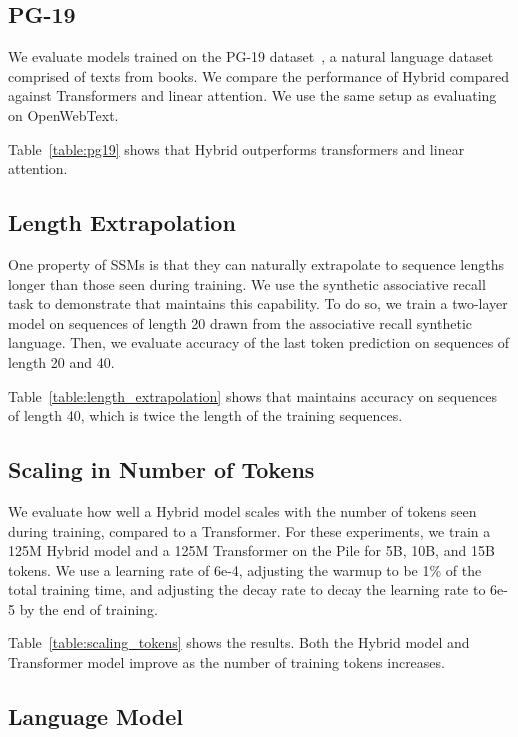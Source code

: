 \subsection{PG-19}
We evaluate models trained on the PG-19 dataset~\citep{rae2019compressive}, a natural language dataset comprised of texts from books.
We compare the performance of Hybrid \hthree compared against Transformers and linear attention.
We use the same setup as evaluating on OpenWebText.



Table~\ref{table:pg19} shows that Hybrid \hthree outperforms transformers and linear attention.

\subsection{Length Extrapolation}
One property of SSMs is that they can naturally extrapolate to sequence lengths longer than those seen during training.
We use the synthetic associative recall task to demonstrate that \hthree maintains this capability.
To do so, we train a two-layer \hthree model on sequences of length 20 drawn from the associative recall synthetic language.
Then, we evaluate accuracy of the last token prediction on sequences of length 20 and 40.



Table~\ref{table:length_extrapolation} shows that \hthree maintains accuracy on sequences of length 40, which is twice the length of the training sequences.

\subsection{Scaling in Number of Tokens}
We evaluate how well a Hybrid \hthree model scales with the number of tokens seen during training, compared to a Transformer.
For these experiments, we train a 125M Hybrid \hthree model and a 125M Transformer on the Pile for 5B, 10B, and 15B tokens.
We use a learning rate of 6e-4, adjusting the warmup to be 1\% of the total training time, and adjusting the decay rate to decay the learning rate to 6e-5 by the end of training.



Table~\ref{table:scaling_tokens} shows the results.
Both the Hybrid \hthree model and Transformer model improve as the number of training tokens increases.

\subsection{\hthree Language Model}



